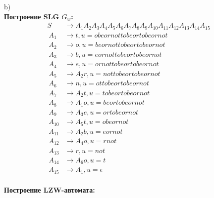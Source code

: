 \documentclass[a4paper,12pt]{article}
\begin{document}
\begin{center} 
\end{center}
b)\\
\textbf{Построение SLG $G_w$:}\\
\begin{align*}
	S&\to A_1A_2A_3A_4A_5A_6A_7A_8A_9A_{10}A_{11}A_{12}A_{13}A_{14}A_{15}\\\
	A_1&\to t,u=obeornottobeortobeornot\\\ 
	A_2&\to o,u=beornottobeortobeornot\\\
	A_3&\to b,u=eornottobeortobeornot\\\
	A_4&\to e,u=ornottobeortobeornot\\\
	A_5&\to A_2r,u=nottobeortobeornot\\\
	A_6&\to n,u=ottobeortobeornot\\\
	A_7&\to A_2t,u=tobeortobeornot\\\
	A_8&\to A_1o,u=beortobeornot\\\
	A_9&\to A_3e,u=ortobeornot\\\
	A_{10}&\to A_5t,u=obeornot\\\
	A_{11}&\to A_2b,u=eornot\\\
	A_{12}&\to A_4o,u=rnot\\\
	A_{13}&\to r,u=not\\\
	A_{14}&\to A_6o,u=t\\\
	A_{15}&\to A_1,u=\epsilon\\\
\end{align*}

\textbf{Построение LZW-автомата:}\\
\end{document}
